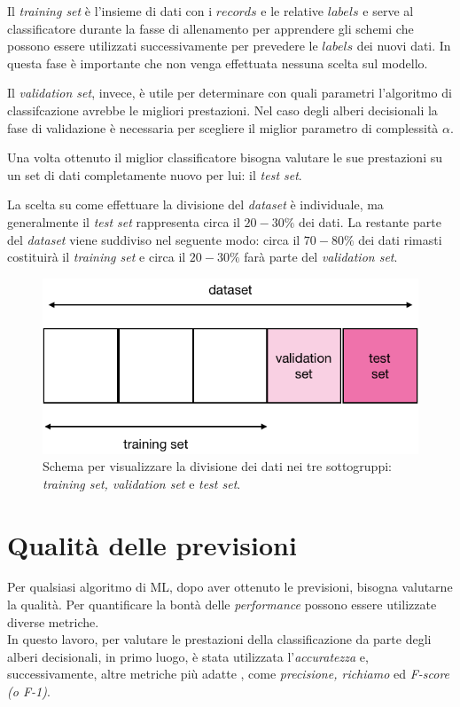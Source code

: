 Il \textit{training set} è l'insieme di dati con i $records$ e le relative $labels$ e serve al classificatore durante la fasse di allenamento per apprendere gli schemi che possono essere utilizzati successivamente per prevedere le $labels$ dei nuovi dati. In questa fase è importante che non venga effettuata nessuna scelta sul modello.

Il \textit{validation set}, invece, è utile per determinare con quali parametri l'algoritmo di classifcazione avrebbe le migliori prestazioni. Nel caso degli alberi decisionali la fase di validazione è necessaria per scegliere il miglior parametro di complessità $\alpha$.

Una volta ottenuto il miglior classificatore bisogna valutare le sue prestazioni su un set di dati completamente nuovo per lui: il \textit{test set}.

La scelta su come effettuare la divisione del \textit{dataset} è individuale, ma generalmente il \textit{test set} rappresenta circa il $20-30\%$ dei dati. La restante parte del \textit{dataset} viene suddiviso nel seguente modo: circa il $70-80\%$ dei dati rimasti costituirà il \textit{training set} e circa il $20-30\%$ farà parte del \textit{validation set}. 

\begin{figure}
\begin{center}
\includegraphics[width=0.6\columnwidth]{images/dataset.png}
\end{center}
\caption{Schema per visualizzare la divisione dei dati nei tre sottogruppi: \textit{training set, validation set} e \textit{test set}.}
\label{fig:dataset}
\end{figure}

\section{Qualità delle previsioni}
\label{sec:metriche}
Per qualsiasi algoritmo di ML, dopo aver ottenuto le previsioni, bisogna valutarne la qualità. Per quantificare la bontà delle \textit{performance} possono essere utilizzate diverse metriche.\\
In questo lavoro, per valutare le prestazioni della classificazione da parte degli alberi decisionali, in primo luogo, è stata utilizzata l'\textit{accuratezza} e, successivamente, altre metriche più adatte , come \textit{precisione, richiamo} ed \textit{F-score (o F-1)}. 

